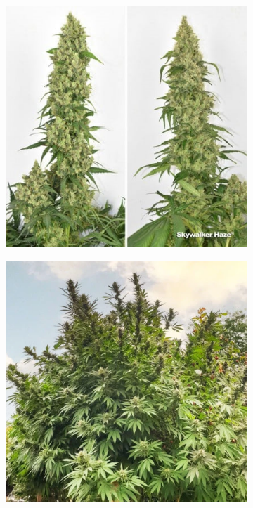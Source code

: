 \begin{figure}[H]
\begin{minipage}[t]{0.48\textwidth}
\begin{subfigure}[t]{.48\textwidth}
            \includegraphics[width=\linewidth]{DUTCH-PASSION_Skywalker-Haze_2}
            \label{fig:cannabis_skywalker-haze_2}
        \end{subfigure}
        \caption[DUTCH PASSION Skywalker Haze]{DUTCH PASSION Skywalker Haze cultivar. From: }
        \label{fig:cannabis_skywalker-haze}
    \end{minipage}
    \hfill
    \begin{minipage}[t]{0.48\textwidth}
        \begin{subfigure}[t]{.48\textwidth}
            \includegraphics[width=\linewidth]{DUTCH-PASSION_Frisian-Dew_1}

\end{subfigure}
\end{minipage}
\end{figure}
